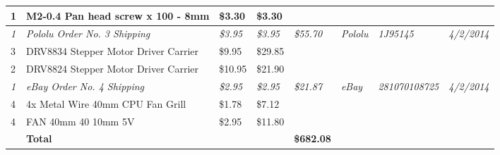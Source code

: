 \begin{table}[h]
{\begin{tabular}{llllllll}
1            & M2-0.4 Pan head screw x 100 - 8mm                 & \$3.30           & \$3.30           &                   &                   &                       &                     \\  \hline \hline
\textit{1}   & \textit{Pololu Order No. 3 Shipping}              & \textit{\$3.95}  & \textit{\$3.95}  & \textit{\$55.70}  & \textit{Pololu}   & \textit{1J95145}      & \textit{4/2/2014}   \\
3            & DRV8834 Stepper Motor Driver Carrier              & \$9.95           & \$29.85          &                   &                   &                       &                     \\
2            & DRV8824 Stepper Motor Driver Carrier              & \$10.95          & \$21.90          &                   &                   &                       &                     \\  \hline \hline
\textit{1}   & \textit{eBay Order No. 4 Shipping}                & \textit{\$2.95}  & \textit{\$2.95}  & \textit{\$21.87}  & \textit{eBay}     & \textit{281070108725} & \textit{4/2/2014}   \\
4            & 4x Metal Wire 40mm CPU Fan Grill                  & \$1.78           & \$7.12           &                   &                   &                       &                     \\
4            & FAN 40mm 40 10mm 5V                               & \$2.95           & \$11.80          &                   &                   &                       &                     \\  \hline \hline
\textbf{}    & \textbf{Total}                                    & \textbf{}        & \textbf{}        & \textbf{\$682.08} & \textbf{}         & \textbf{}             & \textbf{}          
\end{tabular}}
\end{table}

